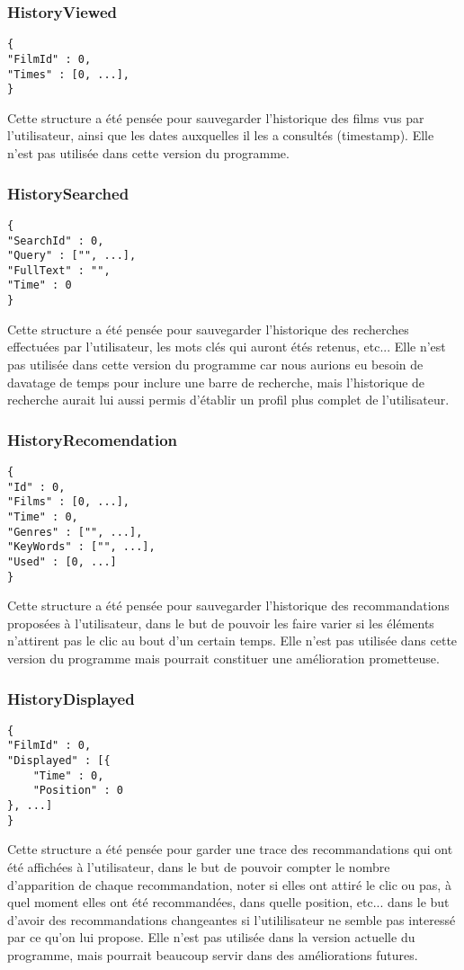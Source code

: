 \subsubsection{HistoryViewed}
\begin{lstlisting}
{
"FilmId" : 0,
"Times" : [0, ...],
}
\end{lstlisting}
Cette structure a été pensée pour sauvegarder l'historique des films vus par l'utilisateur, ainsi que les dates auxquelles il les a consultés (timestamp).
Elle n'est pas utilisée dans cette version du programme.

\subsubsection{HistorySearched}

\begin{lstlisting}
{
"SearchId" : 0,
"Query" : ["", ...],
"FullText" : "",
"Time" : 0
}
\end{lstlisting}
Cette structure a été pensée pour sauvegarder l'historique des recherches effectuées par l'utilisateur, les mots clés qui auront étés retenus, etc...
Elle n'est pas utilisée dans cette version du programme car nous aurions eu besoin de davatage de temps pour inclure une barre de recherche, mais l'historique de recherche aurait lui aussi permis d'établir un profil plus complet de l'utilisateur.


\subsubsection{HistoryRecomendation}

\begin{lstlisting}
{
"Id" : 0,
"Films" : [0, ...],
"Time" : 0,
"Genres" : ["", ...],
"KeyWords" : ["", ...],
"Used" : [0, ...]
}
\end{lstlisting}
Cette structure a été  pensée pour sauvegarder l'historique des recommandations proposées à l'utilisateur, dans le but de pouvoir les faire varier si les éléments n'attirent pas le clic au bout d'un certain temps. Elle n'est pas utilisée dans cette version du programme mais pourrait constituer une amélioration prometteuse.

\subsubsection{HistoryDisplayed}

\begin{lstlisting}
{
"FilmId" : 0,
"Displayed" : [{
	"Time" : 0,
	"Position" : 0
}, ...]
}
\end{lstlisting}
Cette structure a été pensée pour garder une trace des recommandations qui ont été affichées à l'utilisateur, dans le but de pouvoir compter le nombre d'apparition de chaque recommandation, noter si elles ont attiré le clic ou pas, à quel moment elles ont été recommandées, dans quelle position, etc... dans le but d'avoir des recommandations changeantes si l'utililisateur ne semble pas interessé par ce qu'on lui propose.
Elle n'est pas utilisée dans la version actuelle du programme, mais pourrait beaucoup servir dans des améliorations futures.

